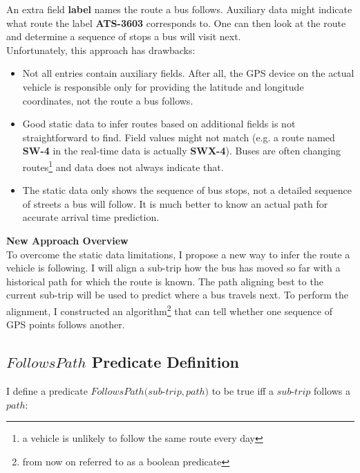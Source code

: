 \documentclass[12pt,a4paper,oneside,openright]{report}
\begin{document}
An extra field \textbf{label} names the route a bus follows. Auxiliary
data might indicate what route the label \textbf{ATS-3603} corresponds to.
One can then look at the route and determine a sequence of stops 
a bus will visit next. \\

Unfortunately, this approach has drawbacks:

\begin{itemize}
\item Not all entries contain auxiliary fields. After all, the GPS device on the
actual vehicle is responsible only for providing the latitude and longitude
coordinates, not the route a bus follows.

\item Good static data to infer routes based on additional fields is not 
straightforward to find. Field values might not match
(e.g. a route named \textbf{SW-4} in the real-time data is actually \textbf{SWX-4}). Buses are often changing routes\footnote{a
vehicle is unlikely to follow the same route every day} and data does not always
indicate that.

\item The static data only shows the sequence of bus stops, not a detailed
sequence of streets a bus will follow. It is much better to know an actual
path for accurate arrival time prediction.
\end{itemize}

\textbf{New Approach Overview} \\

To overcome the static data limitations, I propose a new way to infer the
route a vehicle is following. I will align a sub-trip how the bus has moved
so far with a historical path for which the route is known. The path aligning
best to the current sub-trip will be used to predict where a bus travels next.
To perform the alignment, I constructed an algorithm\footnote{from now on referred to as a boolean predicate} that can tell whether one sequence of GPS points follows another.

\subsection{$FollowsPath$ Predicate Definition}

I define a predicate $FollowsPath(sub$-$trip, path)$ to be true iff a $sub$-$trip$
follows a $path$: \\
\end{document}
